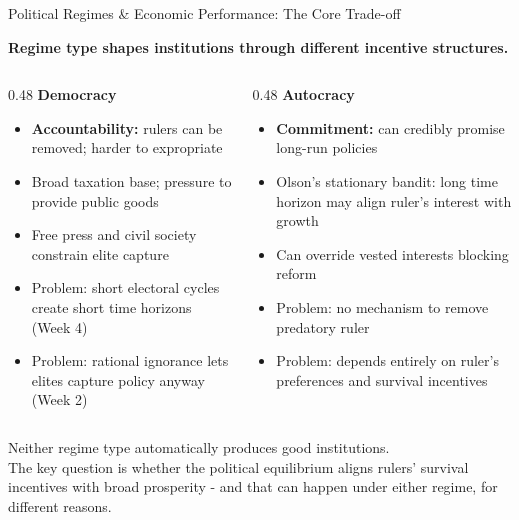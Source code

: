 \documentclass[10pt]{beamer}
\begin{document}
\begin{frame}[allowframebreaks]{Political Regimes \& Economic Performance: The Core Trade-off}

\textbf{Regime type shapes institutions through different incentive structures.}


\begin{columns}[T]
\begin{column}{0.48\textwidth}
\textbf{\color{myTeal} Democracy}\\[6pt]
\begin{itemize}
\item \textbf{Accountability:} rulers can be removed; harder to expropriate
\item Broad taxation base; pressure to provide public goods
\item Free press and civil society constrain elite capture
\item \footnotesize \alert{Problem:} short electoral cycles create short time horizons (Week 4)
\item \footnotesize \alert{Problem:} rational ignorance lets elites capture policy anyway (Week 2)
\end{itemize}
\end{column}
\begin{column}{0.48\textwidth}
\textbf{\color{myOrange} Autocracy}\\[6pt]
\begin{itemize}
\item \textbf{Commitment:} can credibly promise long-run policies
\item Olson's stationary bandit: long time horizon may align ruler's interest with growth
\item Can override vested interests blocking reform
\item \footnotesize \alert{Problem:} no mechanism to remove predatory ruler
\item \footnotesize \alert{Problem:} depends entirely on ruler's preferences and survival incentives
\end{itemize}
\end{column}
\end{columns}


\alert{Neither regime type automatically produces good institutions.}\\
The key question is whether the political equilibrium aligns rulers' survival incentives with broad prosperity - and that can happen under either regime, for different reasons.
\end{frame}
\end{document}
